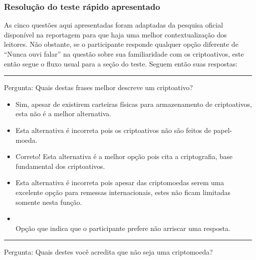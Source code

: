 \subsubsection{Resolução do teste rápido apresentado} \label{pesquisa_quest}

As cinco questões aqui apresentadas foram adaptadas da pesquisa oficial disponível na reportagem para que haja uma melhor contextualização dos leitores. Não obstante, se o participante responde qualquer opção diferente de ``Nunca ouvi falar'' na questão sobre sua familiaridade com os criptoativos, este então segue o fluxo usual para a seção do teste. Seguem então suas respostas:



\rule{\linewidth}{0.5mm}
Pergunta: Quais destas frases melhor descreve um criptoativo?
\begin{itemize}
	\item {}
	
	Sim, apesar de existirem carteiras físicas para armazenamento de criptoativos, esta não é a melhor alternativa.
	
	\item {}
	
	Esta alternativa é incorreta pois os criptoativos não são feitos de papel-moeda. 
	
	\item {}
	
	Correto! Esta alternativa é a melhor opção pois cita a criptografia, base fundamental dos criptoativos.
	
	\item {}
	
	Esta alternativa é incorreta pois apesar das criptomoedas serem uma excelente opção para remessas internacionais, estes não ficam limitadas somente nesta função. 
		
	\item {}\\ Opção que indica que o participante prefere não arriscar uma resposta.

\end{itemize}

\rule{\linewidth}{0.5mm}

Pergunta: Quais destes você acredita que não seja uma criptomoeda?

